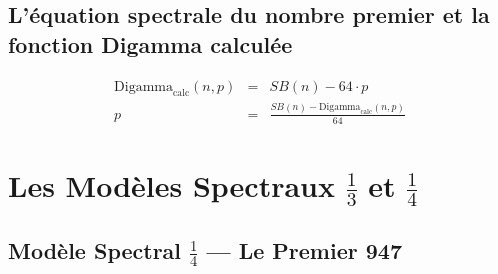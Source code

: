 \documentclass[]{pasj02}
\begin{document}
\subsection{L'équation spectrale du nombre premier et la fonction Digamma
calculée}
\label{ssec:digamma}
\label{hol:digamma_equation}

\begin{eqnarray}
  \mathrm{Digamma}_{\mathrm{calc}}(n,p) &=& SB(n) - 64 \cdot p \\
  p &=& \frac{SB(n) - \mathrm{Digamma}_{\mathrm{calc}}(n,p)}{64}
\end{eqnarray}

\begin{table}
  \label{tab:digamma}
\end{table}

\section{Les Modèles Spectraux $\tfrac{1}{3}$ et $\tfrac{1}{4}$}
\label{sec:modeles}

\subsection{Modèle Spectral $\tfrac{1}{4}$ --- Le Premier 947}
\label{ssec:modele_14}
\label{hol:modele_1_4}
\end{document}
